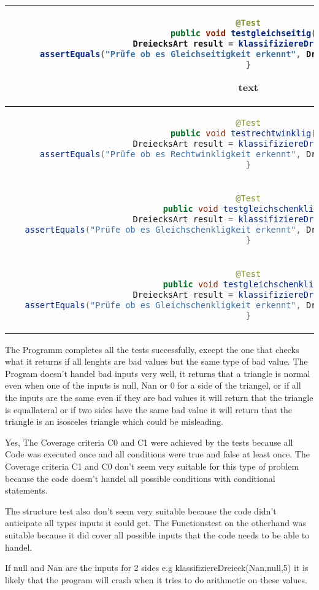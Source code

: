 \begin{parlist}
\begin{center}
\begin{tabular}{ | c | c | }
\begin{lstlisting}[language=java,frame=trBL]
@Test
public void testgleichseitig(){
   DreiecksArt result = klassifiziereDreieck(4,4,4);
   assertEquals("Prüfe ob es Gleichseitigkeit erkennt", DriecksArt.Gliechseitig, result);
}
  \end{lstlisting} text& testing branch 2 \\ 
\hline
  \begin{lstlisting}[language=java,frame=trBL]
@Test
public void testrechtwinklig(){
   DreiecksArt result = klassifiziereDreieck(3,4,5);
   assertEquals("Prüfe ob es Rechtwinkligkeit erkennt", DriecksArt.Rechtwinklig, result);
}
  \end{lstlisting} & Testing Branch 4 \\ 
  \hline
  \begin{lstlisting}[language=java,frame=trBL]
@Test
public void testgleichschenklig(){
   DreiecksArt result = klassifiziereDreieck(4,4,5);
   assertEquals("Prüfe ob es Gleichschenkligkeit erkennt", DriecksArt.Gleichschenklig, result);
}
  \end{lstlisting} &  Testing branch 3 \\ 
  \hline
  \begin{lstlisting}[language=java,frame=trBL]
@Test
public void testgleichschenklig(){
   DreiecksArt result = klassifiziereDreieck(2,4,5);
   assertEquals("Prüfe ob es Gleichschenkligkeit erkennt", DriecksArt.Gleichschenklig, result);
}
  \end{lstlisting} &  Testing branch 1 \\
\end{tabular}
\end{center}

\item The Programm completes all the tests successfully, execpt the one that checks what it returns if all lenghts are bad values but the same type of bad value. The Program doesn't handel bad inputs very well, it returns that a triangle is normal even when one of the inputs is null, Nan or 0 for a side of the triangel, or if all the inputs are the same even if they are bad values it will return that the triangle is equallateral or if two sides have the same bad value it will return that the triangle is an isosceles triangle which could be misleading.

\item Yes, The Coverage criteria C0 and C1 were achieved by the tests because all Code was executed once and all conditions were true and false at least once. The Coverage criteria C1 and C0 don't seem very suitable for this type of problem because the code doesn't handel all possible conditions with conditional statements.
\item The structure test also don't seem very suitable because the code didn't anticipate all types inputs it could get. The Functionstest on the otherhand was suitable because it did cover all possible inputs that the code needs to be able to handel.
\item If null and Nan are the inputs for 2 sides e.g klassifiziereDreieck(Nan,null,5) it is likely that the program will crash when it tries to do arithmetic on these values.

\end{parlist}

